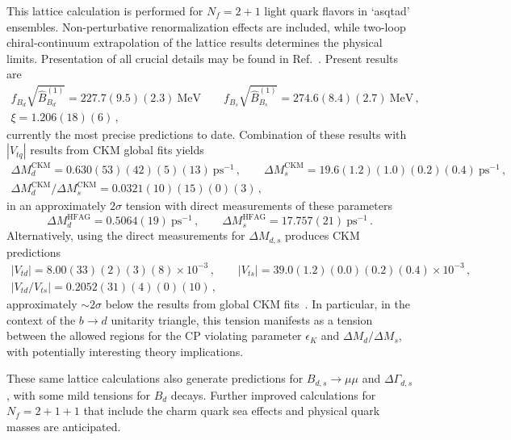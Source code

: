 This lattice calculation is performed for $N_f = 2+1$ light quark flavors in `asqtad' ensembles. Non-perturbative renormalization effects are included, while two-loop chiral-continuum extrapolation of the lattice results determines the physical limits. Presentation of all crucial details may be found in Ref.~\cite{Bazavov:2016nty}. Present results are
\begin{gather}
	f_{B_d}\sqrt{\hat{B}^{(1)}_{B_d}} = 227.7(9.5)(2.3)~\text{MeV} \qquad f_{B_s}\sqrt{\hat{B}^{(1)}_{B_s}} = 274.6(8.4)(2.7)~\text{MeV}\,,\nonumber\\
		\xi = 1.206(18)(6)\,,
\end{gather}
currently the most precise predictions to date. Combination of these results with $|V_{tq}|$ results from CKM global fits yields 
\begin{gather}
	\Delta M^{\text{CKM}}_d = 0.630(53)(42)(5)(13)~\text{ps}^{-1}\,, \qquad \Delta M^{\text{CKM}}_s = 19.6(1.2)(1.0)(0.2)(0.4)~\text{ps}^{-1}\,,\nonumber \\
	\Delta M^{\text{CKM}}_d/\Delta M^{\text{CKM}}_s = 0.0321(10)(15)(0)(3)\,,
\end{gather}
in an approximately $2\sigma$ tension with direct measurements of these parameters \cite{HFAG}
\begin{equation}
	\Delta M^{\text{HFAG}}_d = 0.5064(19)~\text{ps}^{-1}\,,\qquad \Delta M^{\text{HFAG}}_s = 17.757(21)~\text{ps}^{-1}\,.
\end{equation}
Alternatively, using the direct measurements for $\Delta M_{d,s}$ produces CKM predictions
\begin{gather}
	|V_{td}| = 8.00(33)(2)(3)(8)\times 10^{-3}\,,\qquad |V_{ts}| = 39.0(1.2)(0.0)(0.2)(0.4)\times 10^{-3}\,,\nonumber\\
	|V_{td}/V_{ts}| = 0.2052(31)(4)(0)(10)\,,
\end{gather}
approximately $\sim2\sigma$ below the results from global CKM fits~\cite{Charles:2004jd, Charles:2015gya}. In particular, in the context of the $b \to d$ unitarity triangle, this tension manifests as a tension between the allowed regions for the CP violating parameter $\epsilon_K$ and $\Delta M_{d}/\Delta M_s$, with potentially interesting theory implications. 

These same lattice calculations also generate predictions for $B_{d,s} \to \mu\mu$ and $\Delta\Gamma_{d,s}$, with some mild tensions for $B_d$ decays. Further improved calculations for $N_f = 2 + 1 + 1$ that include the charm quark sea effects and physical quark masses are anticipated.

